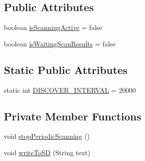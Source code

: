 \subsection*{Public Attributes}
\begin{DoxyCompactItemize}
\item 
boolean \hyperlink{classcom_1_1social_1_1proximity_1_1_b_t_manager_a7f0ad6bc9d218fac0f1958dd7af8d700}{is\+Scanning\+Active} = false
\item 
boolean \hyperlink{classcom_1_1social_1_1proximity_1_1_b_t_manager_a98190232d2bf682b7d086aa407e05cc6}{is\+Waiting\+Scan\+Results} = false
\end{DoxyCompactItemize}
\subsection*{Static Public Attributes}
\begin{DoxyCompactItemize}
\item 
static int \hyperlink{classcom_1_1social_1_1proximity_1_1_b_t_manager_a6c0f8c1f71eb7499aa1b974ca823c777}{D\+I\+S\+C\+O\+V\+E\+R\+\_\+\+I\+N\+T\+E\+R\+V\+A\+L} = 20000
\end{DoxyCompactItemize}
\subsection*{Private Member Functions}
\begin{DoxyCompactItemize}
\item 
void \hyperlink{classcom_1_1social_1_1proximity_1_1_b_t_manager_a5491bf8a294ef910a9aa8fd3eff6d2c7}{stop\+Periodic\+Scanning} ()
\item 
void \hyperlink{classcom_1_1social_1_1proximity_1_1_b_t_manager_abc5af9d7dd7b61e29bae2b7cfe463066}{write\+To\+S\+D} (String text)
\end{DoxyCompactItemize}
